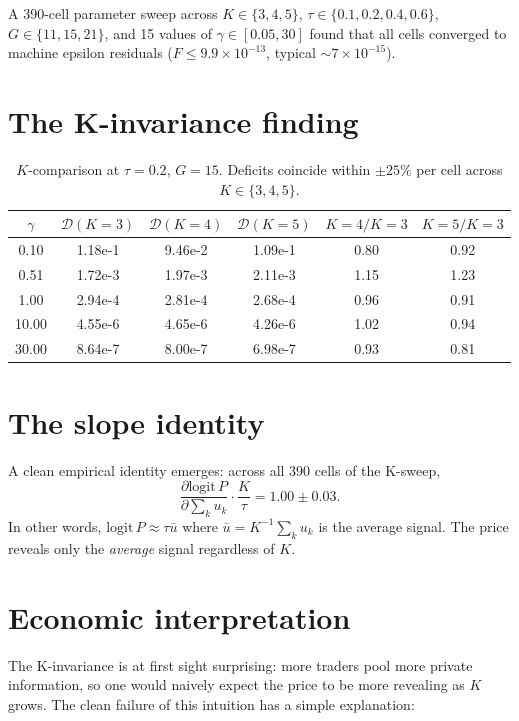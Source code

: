 \documentclass[11pt]{article}
\newcommand{\1}{\mathbf{1}}
\newcommand{\deficit}{\mathcal{D}}
\begin{document}
A 390-cell parameter sweep across $K \in \{3, 4, 5\}$, $\tau \in \{0.1,
0.2, 0.4, 0.6\}$, $G \in \{11, 15, 21\}$, and 15 values of
$\gamma \in [0.05, 30]$ found that all cells converged to machine
epsilon residuals ($F \le 9.9 \times 10^{-13}$, typical $\sim 7 \times
10^{-15}$).

\section{The K-invariance finding}

\begin{table}[H]\centering\small
\begin{tabular}{c|ccccc}
\toprule
$\gamma$ & $\deficit(K{=}3)$ & $\deficit(K{=}4)$ & $\deficit(K{=}5)$ & $K{=}4/K{=}3$ & $K{=}5/K{=}3$\\
\midrule
0.10  & 1.18e-1 & 9.46e-2 & 1.09e-1 & 0.80 & 0.92\\
0.51  & 1.72e-3 & 1.97e-3 & 2.11e-3 & 1.15 & 1.23\\
1.00  & 2.94e-4 & 2.81e-4 & 2.68e-4 & 0.96 & 0.91\\
10.00 & 4.55e-6 & 4.65e-6 & 4.26e-6 & 1.02 & 0.94\\
30.00 & 8.64e-7 & 8.00e-7 & 6.98e-7 & 0.93 & 0.81\\
\bottomrule
\end{tabular}
\caption{$K$-comparison at $\tau=0.2$, $G=15$.  Deficits coincide within
$\pm 25\%$ per cell across $K \in \{3, 4, 5\}$.}
\end{table}

\section{The slope identity}

A clean empirical identity emerges: across all 390 cells of the K-sweep,
\begin{equation}
\frac{\partial \mathrm{logit}\,P}{\partial \sum_k u_k} \cdot \frac{K}{\tau} = 1.00 \pm 0.03.
\label{eq:slope-identity}
\end{equation}
In other words, $\mathrm{logit}\,P \approx \tau \bar u$ where $\bar u = K^{-1}
\sum_k u_k$ is the average signal.  The price reveals only the
\emph{average} signal regardless of $K$.

\section{Economic interpretation}

The K-invariance is at first sight surprising: more traders pool more
private information, so one would naively expect the price to be more
revealing as $K$ grows.  The clean failure of this intuition has a
simple explanation:
\end{document}
